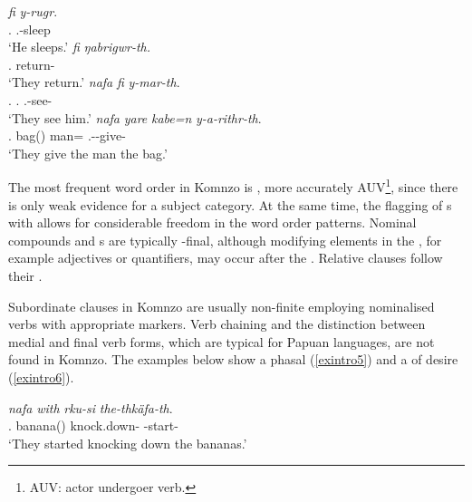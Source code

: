 \begin{exe}
\ex
\label{exintro4}
\begin{xlist}
	\ex %
	\gll \emph{fi} \emph{y-rugr}.\\
	\Third.{\Abs} \Tsg.\Masc-sleep\\
	\trans `He sleeps.'
	\ex %
	\gll \emph{fi} \emph{ŋabrigwr-th.}\\
	\Third.{\Abs} return-\Tpl\\
	\trans `They return.'
	\ex %
	\gll \emph{nafa} \emph{fi} \emph{y-mar-th}.\\
	\Tpl{}.{\Erg} \Third.{\Abs} \Tsg.\Masc-see-\Tpl{}\\
	\trans `They see him.'
	\ex
	\gll \emph{nafa} \emph{yare} \emph{kabe=n} \emph{y-a-rithr-th}.\\
	\Tpl{}.{\Erg} bag(\Abs) man={\Dat} \Tsg.\Masc-\Vc-give-\Tpl{}\\
	\trans `They give the man the bag.'
\end{xlist}
\end{exe}

The most frequent word order in Komnzo is , more accurately AUV\footnote{AUV: actor undergoer verb.}, since there is only weak evidence for a subject category. At the same time, the flagging of s with  allows for considerable freedom in the word order patterns. Nominal compounds and s are typically -final, although modifying elements in the , for example adjectives or quantifiers, may occur after the . Relative clauses follow their .

Subordinate clauses in Komnzo are usually non-finite employing nominalised verbs with appropriate  markers. Verb chaining and the distinction between medial and final verb forms, which are typical for Papuan languages, are not found in Komnzo. The examples below show a phasal  (\ref{exintro5}) and a  of desire (\ref{exintro6}).

\begin{exe}
	\ex
	\gll \emph{nafa} \emph{with} \emph{rku-si} \emph{the-thkäfa-th}.\\
	\Tnsg.{\Erg} banana({\Abs}) knock.down-{\Nmlz} \Stpl-start-\Stsg\\
	\trans `They started knocking down the bananas.'
	\label{exintro5}
\end{exe}

